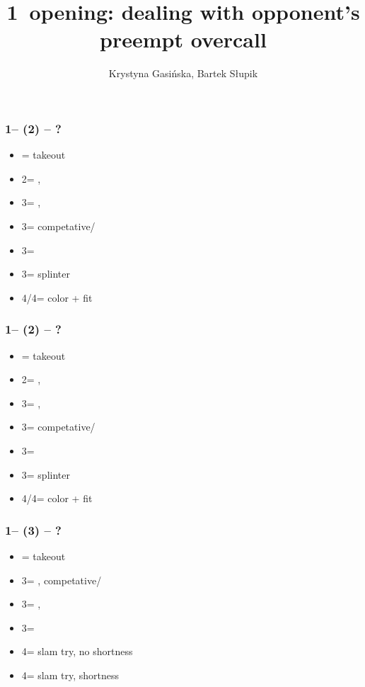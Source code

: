 \documentclass[12pt, a4paper]{article}
\title{1\hearts\ opening: dealing with opponent's preempt overcall}
\author{Krystyna Gasińska, Bartek Słupik}
\begin{document}
\maketitle


\subsubsection*{1\hearts -- (2\spades) -- ?}
\begin{itemize}
    \item \dbl = takeout
    \item 2\nt = \clubs, \invp
    \item 3\clubs = \diams, \invp
    \item 3\diams = \hearts competative/\gf
    \item 3\hearts = \hearts\ \inv
    \item 3\spades = splinter
    \item 4\clubs/4\diams = color + fit
\end{itemize}

\subsubsection*{1\hearts -- (2\spades) -- ?}
\begin{itemize}
    \item \dbl = takeout
    \item 2\nt = \clubs, \invp
    \item 3\clubs = \diams, \invp
    \item 3\diams = \hearts competative/\gf
    \item 3\hearts = \hearts\ \inv
    \item 3\spades = splinter
    \item 4\clubs/4\diams = color + fit
\end{itemize}

\subsubsection*{1\hearts -- (3\clubs) -- ?}
\begin{itemize}
    \item \dbl = takeout
    \item 3\diams = \hearts, competative/\gf
    \item 3\hearts = \hearts, \inv
    \item 3\spades = \spades \gf
    \item 4\clubs = slam try, no \clubs shortness
    \item 4\diams = slam try, \clubs shortness
\end{itemize}
\end{document}
